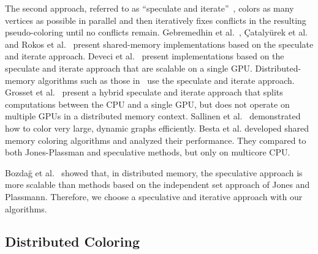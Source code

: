 The second approach, referred to as ``speculate and iterate''~\cite{IAB:gebremedhin2000scalable,IAB:ccatalyurek2012graph}, colors as many vertices as possible in parallel and then iteratively fixes conflicts in the resulting pseudo-coloring until no conflicts remain.
Gebremedhin et al.~\cite{IAB:gebremedhin2000scalable}, {\c{C}}ataly{\"{u}}rek et al.~\cite{IAB:ccatalyurek2012graph} and Rokos et al.~\cite{IAB:rokos2015fast} present shared-memory implementations based on the speculate and iterate approach.
Deveci et al.~\cite{IAB:deveci2016parallel} present implementations based on the speculate and iterate approach that are scalable on a single GPU.
Distributed-memory algorithms such as those in~\cite{IAB:bozdaug2008framework,IAB:sariyuce2012scalable} use the speculate and iterate approach. 
Grosset et al.~\cite{IAB:grosset2011evaluating} present a hybrid speculate and iterate approach that splits computations between the CPU and a single GPU, 
but does not operate on multiple GPUs in a distributed memory context.
Sallinen et al.~\cite{Sallinen16} demonstrated how to color very large, dynamic graphs efficiently.
Besta et al. \cite{Besta20} developed shared memory coloring algorithms and analyzed their performance.
They compared to both Jones-Plassman and speculative methods, but only on multicore CPU.

Bozda{\u{g}} et al.~\cite{IAB:bozdaug2008framework} showed that, in distributed memory, the speculative approach is more scalable than methods based on the independent set approach of Jones and Plassmann.
Therefore, we choose a speculative and iterative approach with our algorithms.

\subsection{Distributed Coloring}



